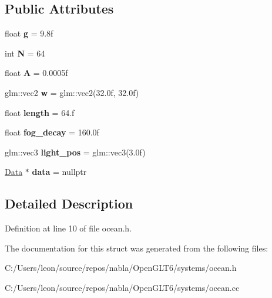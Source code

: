 \subsection*{Public Attributes}
\begin{DoxyCompactItemize}
\item 
\mbox{\label{structnabla_1_1_ocean_parameters_ac89c087f42807c4fd1143771b676a8e6}} 
float {\bfseries g} = 9.\+8f
\item 
\mbox{\label{structnabla_1_1_ocean_parameters_a9e668dbdb2478456072a1145a5e2a536}} 
int {\bfseries N} = 64
\item 
\mbox{\label{structnabla_1_1_ocean_parameters_a542888cb07178f38a5eab244991b02b7}} 
float {\bfseries A} = 0.\+0005f
\item 
\mbox{\label{structnabla_1_1_ocean_parameters_a98ae08cc5388dd12d62b193a58607f12}} 
glm\+::vec2 {\bfseries w} = glm\+::vec2(32.\+0f, 32.\+0f)
\item 
\mbox{\label{structnabla_1_1_ocean_parameters_a00f642deeebb5c7d8f10016838f23c3e}} 
float {\bfseries length} = 64.f
\item 
\mbox{\label{structnabla_1_1_ocean_parameters_a1da0e47cf6a4ca9d9b404bf26bd48a43}} 
float {\bfseries fog\+\_\+decay} = 160.\+0f
\item 
\mbox{\label{structnabla_1_1_ocean_parameters_aeeb33bccddb51fd0136de8f0ce7078ba}} 
glm\+::vec3 {\bfseries light\+\_\+pos} = glm\+::vec3(3.\+0f)
\item 
\mbox{\label{structnabla_1_1_ocean_parameters_a5f9397fed3077117a3d74d8e5d1b9d6d}} 
\mbox{\hyperlink{structnabla_1_1_ocean_parameters_1_1_data}{Data}} $\ast$ {\bfseries data} = nullptr
\end{DoxyCompactItemize}


\subsection{Detailed Description}


Definition at line 10 of file ocean.\+h.



The documentation for this struct was generated from the following files\+:\begin{DoxyCompactItemize}
\item 
C\+:/\+Users/leon/source/repos/nabla/\+Open\+G\+L\+T6/systems/ocean.\+h\item 
C\+:/\+Users/leon/source/repos/nabla/\+Open\+G\+L\+T6/systems/ocean.\+cc\end{DoxyCompactItemize}
